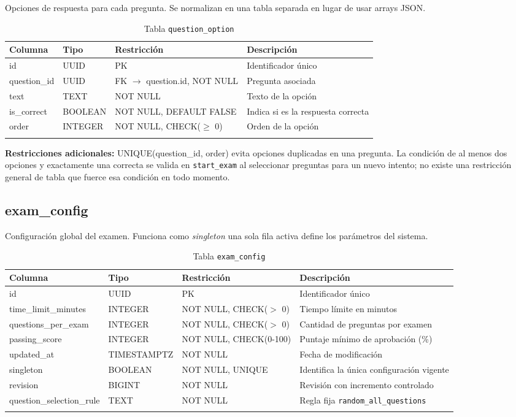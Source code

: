 Opciones de respuesta para cada pregunta. Se normalizan en una tabla separada en lugar de usar arrays JSON.

\begin{longtable}{l l l p{5cm}}
\toprule
\textbf{Columna} & \textbf{Tipo} & \textbf{Restricción} & \textbf{Descripción} \\
\midrule
\endhead
id & UUID & PK & Identificador único \\
question\_id & UUID & FK $\rightarrow$ question.id, NOT NULL & Pregunta asociada \\
text & TEXT & NOT NULL & Texto de la opción \\
is\_correct & BOOLEAN & NOT NULL, DEFAULT FALSE & Indica si es la respuesta correcta \\
order & INTEGER & NOT NULL, CHECK($\ge$ 0) & Orden de la opción \\
\bottomrule
\caption{Tabla \texttt{question\_option}}
\end{longtable}

\textbf{Restricciones adicionales:} UNIQUE(question\_id, order) evita opciones duplicadas en una pregunta. La condición de al menos dos opciones y exactamente una correcta se valida en \texttt{start\_exam} al seleccionar preguntas para un nuevo intento; no existe una restricción general de tabla que fuerce esa condición en todo momento.

\subsection{exam\_config}

Configuración global del examen. Funciona como \textit{singleton} \textemdash{} una sola fila activa define los parámetros del sistema.

\begin{longtable}{l l l p{5cm}}
\toprule
\textbf{Columna} & \textbf{Tipo} & \textbf{Restricción} & \textbf{Descripción} \\
\midrule
\endhead
id & UUID & PK & Identificador único \\
time\_limit\_minutes & INTEGER & NOT NULL, CHECK($>$ 0) & Tiempo límite en minutos \\
questions\_per\_exam & INTEGER & NOT NULL, CHECK($>$ 0) & Cantidad de preguntas por examen \\
passing\_score & INTEGER & NOT NULL, CHECK(0-100) & Puntaje mínimo de aprobación (\%) \\
updated\_at & TIMESTAMPTZ & NOT NULL & Fecha de modificación \\
singleton & BOOLEAN & NOT NULL, UNIQUE & Identifica la única configuración vigente \\
revision & BIGINT & NOT NULL & Revisión con incremento controlado \\
question\_selection\_rule & TEXT & NOT NULL & Regla fija \texttt{random\_all\_questions} \\
\bottomrule
\caption{Tabla \texttt{exam\_config}}
\end{longtable}


